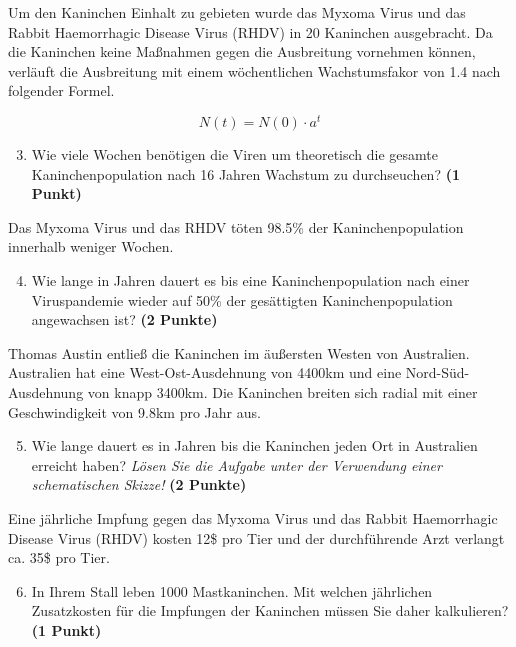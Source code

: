 \documentclass[a4paper, 9pt]{scrartcl}\usepackage[]{graphicx}\usepackage[]{xcolor}
\begin{document}
Um den Kaninchen Einhalt zu gebieten wurde das Myxoma Virus und das Rabbit
Haemorrhagic Disease Virus (RHDV) in 20 Kaninchen
ausgebracht. Da die Kaninchen keine Ma{\ss}nahmen gegen die Ausbreitung
vornehmen k{\"o}nnen, verl{\"a}uft die Ausbreitung mit einem w{\"o}chentlichen
Wachstumsfakor von 1.4 nach folgender Formel.

\begin{equation*}
  N(t) = N(0) \cdot a^t
\end{equation*}

\begin{enumerate}
  \setcounter{enumi}{2}
\item Wie viele Wochen ben{\"o}tigen die Viren um theoretisch die gesamte
  Kaninchenpopulation nach 16 Jahren Wachstum zu
  durchseuchen? \textbf{(1 Punkt)}
\end{enumerate}

Das Myxoma Virus und das RHDV t{\"o}ten 98.5\% der
Kaninchenpopulation innerhalb weniger Wochen.

\begin{enumerate}
  \setcounter{enumi}{3}  
\item Wie lange in Jahren dauert es bis eine Kaninchenpopulation nach einer
  Viruspandemie wieder auf 50\% der ges{\"a}ttigten
  Kaninchenpopulation angewachsen ist?  \textbf{(2 Punkte)}
\end{enumerate}

Thomas Austin entlie{\ss} die Kaninchen im {\"a}u{\ss}ersten Westen von
Australien. Australien hat eine West-Ost-Ausdehnung von 4400km
und eine Nord-S{\"u}d-Ausdehnung von knapp 3400km. Die Kaninchen
breiten sich radial mit einer Geschwindigkeit von 9.8km pro
Jahr aus.

\begin{enumerate}
  \setcounter{enumi}{4}
\item Wie lange dauert es in Jahren bis die Kaninchen jeden Ort
  in Australien erreicht haben? \textit{L{\"o}sen Sie die Aufgabe unter der
    Verwendung einer schematischen Skizze!} \textbf{(2 Punkte)}
\end{enumerate}

Eine j{\"a}hrliche Impfung gegen das Myxoma Virus und das Rabbit Haemorrhagic
Disease Virus (RHDV) kosten 12\$ pro Tier und der
durchf{\"u}hrende Arzt verlangt ca. 35\$ pro Tier.

\begin{enumerate}
  \setcounter{enumi}{5}
\item In Ihrem Stall leben 1000 Mastkaninchen. Mit welchen
  j{\"a}hrlichen Zusatzkosten f{\"u}r die Impfungen der Kaninchen m{\"u}ssen Sie daher
  kalkulieren? \textbf{(1 Punkt)}
\end{enumerate}
 
\end{document}
